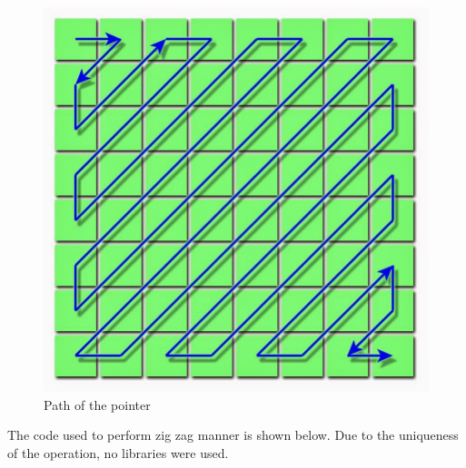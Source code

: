 \documentclass{article}
\begin{document}
\begin{figure}
\includegraphics[width=\linewidth]{./figures/zigzag.jpg}
\caption{Path of the pointer~\autocite{dctProcessing}}
\end{figure}

The code used to perform zig zag manner is shown below.
Due to the uniqueness of the operation, no libraries were used.
\end{document}
